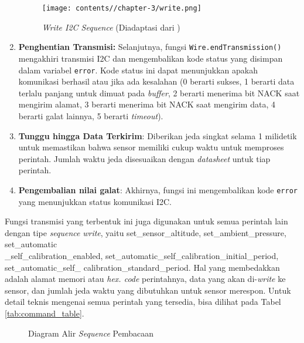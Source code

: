 \begin{enumerate}
            \begin{figure}[ht]
                \centering
                \texttt{[image: contents//chapter-3/write.png]}
                \caption{\textit{Write I2C Sequence} (Diadaptasi dari \cite{scd4x_datasheet})}
                \label{fig:write}
            \end{figure}
            
            \item \textbf{Penghentian Transmisi: } Selanjutnya, fungsi \texttt{Wire.endTransmission()} mengakhiri transmisi I2C dan mengembalikan kode status yang disimpan dalam variabel \texttt{error}. Kode status ini dapat menunjukkan apakah komunikasi berhasil atau jika ada kesalahan (0 berarti sukses, 1 berarti data terlalu panjang untuk dimuat pada \textit{buffer}, 2 berarti menerima bit NACK saat mengirim alamat, 3 berarti menerima bit NACK saat mengirim data, 4 berarti galat lainnya, 5 berarti \textit{timeout}).
            
            \item \textbf{Tunggu hingga Data Terkirim}: Diberikan jeda singkat selama 1 milidetik untuk memastikan bahwa sensor memiliki cukup waktu untuk memproses perintah. Jumlah waktu jeda disesuaikan dengan \textit{datasheet} untuk tiap perintah. 
            
            \item \textbf{Pengembalian nilai galat}: Akhirnya, fungsi ini mengembalikan kode \texttt{error} yang menunjukkan status komunikasi I2C.
        \end{enumerate}
        
        Fungsi transmisi yang terbentuk ini juga digunakan untuk semua perintah lain dengan tipe \textit{sequence} \textit{write}, yaitu set\_sensor\_altitude, set\_ambient\_pressure, set\_automatic\\ \_self\_calibration\_enabled, set\_automatic\_self\_calibration\_initial\_period, set\_automatic\_self\_ calibration\_standard\_period. Hal yang membedakkan adalah alamat memori atau \textit{hex. code} perintahnya, data yang akan di-\textit{write} ke sensor, dan jumlah jeda waktu yang dibutuhkan untuk sensor merespon. Untuk detail teknis mengenai semua perintah yang tersedia, bisa dilihat pada Tabel \ref{tab:command_table}.

        \begin{figure}[H]
            \centering
            \caption{Diagram Alir \textit{Sequence} Pembacaan}
            \label{fig:read_flow}
        \end{figure}

